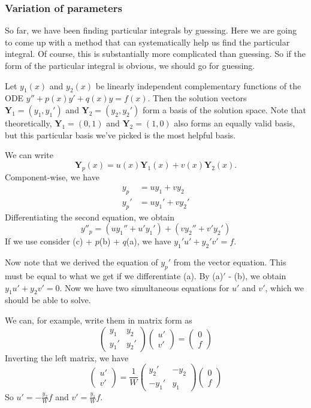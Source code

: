 \documentclass[a4paper]{article}
\begin{document}
\subsubsection{Variation of parameters}
So far, we have been finding particular integrals by guessing. Here we are going to come up with a method that can systematically help us find the particular integral. Of course, this is substantially more complicated than guessing. So if the form of the particular integral is obvious, we should go for guessing.

Let $y_1(x)$ and $y_2(x)$ be linearly independent complementary functions of the ODE $y'' + p(x)y' + q(x)y = f(x)$. Then the solution vectors $\mathbf{Y}_1 = (y_1, y_1')$ and $\mathbf{Y}_2 = (y_2, y_2')$ form a basis of the solution space. Note that theoretically, $\mathbf{Y}_1 = (0, 1)$ and $\mathbf{Y}_2 = (1, 0)$ also forms an equally valid basis, but this particular basis we've picked is the most helpful basis.

We can write
\[
  \mathbf{Y}_p(x) = u(x)\mathbf{Y}_1(x) + v(x)\mathbf{Y}_2(x).
\]
Component-wise, we have
\begin{align*}
  y_p &= uy_1 + vy_2 \tag{a}\\
  y_p' &= uy_1' + vy_2' \tag{b}
\end{align*}
Differentiating the second equation, we obtain
\[
  y''_p = (uy_1'' + u'y_1') + (vy_2'' + v'y_2') \tag{c}
\]
If we use consider (c) + $p$(b) + $q$(a), we have $y_1' u' + y_2'v' = f$.

Now note that we derived the equation of $y_p'$ from the vector equation. This must be equal to what we get if we differentiate (a). By (a)$'$ - (b), we obtain $y_1u' + y_2v' = 0$. Now we have two simultaneous equations for $u'$ and $v'$, which we should be able to solve.

We can, for example, write them in matrix form as
\[
  \begin{pmatrix}
    y_1 & y_2\\
    y_1' & y_2'
  \end{pmatrix}
  \begin{pmatrix}
    u'\\
    v'
  \end{pmatrix}
  =
  \begin{pmatrix}
    0\\
    f
  \end{pmatrix}
\]
Inverting the left matrix, we have
\[
  \begin{pmatrix}
    u'\\
    v'
  \end{pmatrix} = \frac{1}{W}
  \begin{pmatrix}
    y_2' & -y_2\\
    -y_1' & y_1
  \end{pmatrix}
  \begin{pmatrix}
    0\\f
  \end{pmatrix}
\]
So $u' = -\frac{y_2}{W}f$ and $v' = \frac{y_1}{W}f$.
\end{document}
